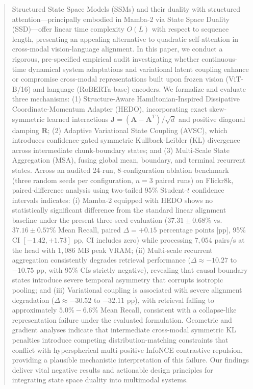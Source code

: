 \documentclass[conference]{IEEEtran}
\begin{document}
\begin{abstract}
Structured State Space Models (SSMs) and their duality with structured attention---principally embodied in Mamba-2 via State Space Duality (SSD)---offer linear time complexity $O(L)$ with respect to sequence length, presenting an appealing alternative to quadratic self-attention in cross-modal vision-language alignment. In this paper, we conduct a rigorous, pre-specified empirical audit investigating whether continuous-time dynamical system adaptations and variational latent coupling enhance or compromise cross-modal representations built upon frozen vision (ViT-B/16) and language (RoBERTa-base) encoders. We formalize and evaluate three mechanisms: (1) Structure-Aware Hamiltonian-Inspired Dissipative Coordinate-Momentum Adapter (HEDO), incorporating exact skew-symmetric learned interactions $\mathbf{J} = (\mathbf{A} - \mathbf{A}^T)/\sqrt{d}$ and positive diagonal damping $\mathbf{R}$; (2) Adaptive Variational State Coupling (AVSC), which introduces confidence-gated symmetric Kullback-Leibler (KL) divergence across intermediate chunk-boundary states; and (3) Multi-Scale State Aggregation (MSA), fusing global mean, boundary, and terminal recurrent states. Across an audited 24-run, 8-configuration ablation benchmark (three random seeds per configuration, $n=3$ paired runs) on Flickr8k, paired-difference analysis using two-tailed 95\% Student-$t$ confidence intervals indicates: (i) Mamba-2 equipped with HEDO shows no statistically significant difference from the standard linear alignment baseline under the present three-seed evaluation ($37.31 \pm 0.68\%$ vs. $37.16 \pm 0.57\%$ Mean Recall, paired $\Delta = +0.15$ percentage points [pp], 95\% CI $[-1.42, +1.73]$ pp, CI includes zero) while processing $7,054$ pairs/s at the head with $1,086$ MB peak VRAM; (ii) Multi-scale recurrent aggregation consistently degrades retrieval performance ($\Delta \approx -10.27$ to $-10.75$ pp, with 95\% CIs strictly negative), revealing that causal boundary states introduce severe temporal asymmetry that corrupts isotropic pooling; and (iii) Variational coupling is associated with severe alignment degradation ($\Delta \approx -30.52$ to $-32.11$ pp), with retrieval falling to approximately $5.0\%-6.6\%$ Mean Recall, consistent with a collapse-like representation failure under the evaluated formulation. Geometric and gradient analyses indicate that intermediate cross-modal symmetric KL penalties introduce competing distribution-matching constraints that conflict with hyperspherical multi-positive InfoNCE contrastive repulsion, providing a plausible mechanistic interpretation of this failure. Our findings deliver vital negative results and actionable design principles for integrating state space duality into multimodal systems.
\end{abstract}
\end{document}
